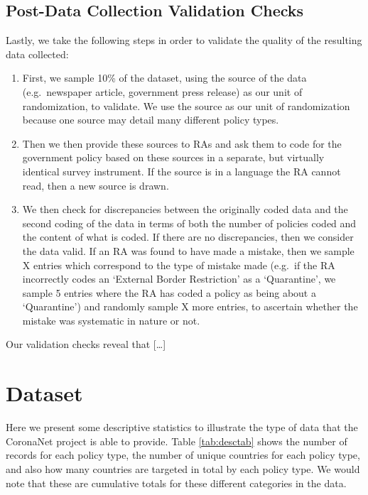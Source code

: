\documentclass[]{article}
\begin{document}
\hypertarget{post-data-collection-validation-checks}{%
\subsection{Post-Data Collection Validation Checks}\label{post-data-collection-validation-checks}}

Lastly, we take the following steps in order to validate the quality of the resulting data collected:

\begin{enumerate}
\def\labelenumi{\arabic{enumi}.}
\item
  First, we sample 10\% of the dataset, using the source of the data (e.g.~newspaper article, government press release) as our unit of randomization, to validate. We use the source as our unit of randomization because one source may detail many different policy types.
\item
  Then we then provide these sources to RAs and ask them to code for the government policy based on these sources in a separate, but virtually identical survey instrument. If the source is in a language the RA cannot read, then a new source is drawn.
\item
  We then check for discrepancies between the originally coded data and the second coding of the data in terms of both the number of policies coded and the content of what is coded. If there are no discrepancies, then we consider the data valid. If an RA was found to have made a mistake, then we sample X entries which correspond to the type of mistake made (e.g.~if the RA incorrectly codes an `External Border Restriction' as a `Quarantine', we sample 5 entries where the RA has coded a policy as being about a `Quarantine') and randomly sample X more entries, to ascertain whether the mistake was systematic in nature or not.
\end{enumerate}

Our validation checks reveal that {[}\ldots{}{]}

\hypertarget{dataset}{%
\section{Dataset}\label{dataset}}

Here we present some descriptive statistics to illustrate the type of data that the CoronaNet project is able to provide. Table \ref{tab:desctab} shows the number of records for each policy type, the number of unique countries for each policy type, and also how many countries are targeted in total by each policy type. We would note that these are cumulative totals for these different categories in the data.
\end{document}
